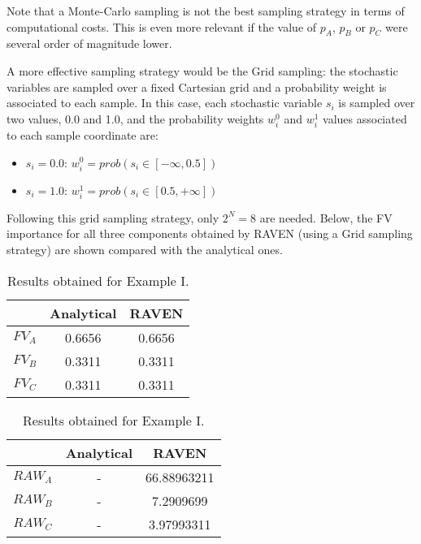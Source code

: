 Note that a Monte-Carlo sampling is not the best sampling strategy in terms of computational 
costs. This is even more relevant if the value of $p_A$, $p_B$ or $p_C$ were several order of 
magnitude lower. 

A more effective sampling strategy would be the Grid sampling: the stochastic variables 
are sampled over a fixed Cartesian grid and a probability weight is associated to each sample. 
In this case, each stochastic variable $s_i$ is sampled over two values, 0.0 and 1.0, and the 
probability weights $w_i^0$ and $w_i^1$ values associated to each sample coordinate are:
\begin{itemize}
  \item $s_i=0.0$: $w_i^0=prob(s_i \in [-\infty,0.5])$
  \item $s_i=1.0$: $w_i^1=prob(s_i \in [0.5,+\infty])$
\end{itemize}
Following this grid sampling strategy, only $2^N=8$ are needed.
Below, the FV importance for all three components obtained by RAVEN (using a Grid sampling 
strategy) are shown compared with the analytical ones.

\begin{table}
    \caption{Results obtained for Example I.}
    \begin{minipage}{.5\linewidth}
      \centering
      \begin{tabular}{c | c | c } 
        \hline 
         & Analytical & RAVEN \\ 
        \hline 
        $FV_A$ & 0.6656 & 0.6656   \\
        $FV_B$ & 0.3311 & 0.3311   \\
        $FV_C$ & 0.3311 & 0.3311   \\
        \hline 
      \end{tabular}
    \end{minipage}%
    \begin{minipage}{.5\linewidth}
      \centering
      \begin{tabular}{c | c | c } 
        \hline 
         & Analytical & RAVEN \\ 
        \hline 
        $RAW_A$ & - & 66.88963211  \\
        $RAW_B$ & - & 7.2909699    \\
        $RAW_C$ & - & 3.97993311   \\
        \hline 
      \end{tabular}
    \end{minipage} 
\end{table}


